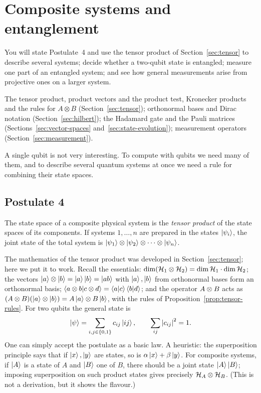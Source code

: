 \section{Composite systems and entanglement}\label{sec:composite}

\begin{objectives}
  You will state Postulate~4 and use the tensor product of Section~\ref{sec:tensor} to describe several systems; decide whether a two-qubit state is entangled; measure one part of an entangled system; and see how general measurements arise from projective ones on a larger system.
\end{objectives}

\begin{recall}
  The tensor product, product vectors and the product test, Kronecker products and the rules for $A\otimes B$ (Section~\ref{sec:tensor}); orthonormal bases and Dirac notation (Section~\ref{sec:hilbert}); the Hadamard gate and the Pauli matrices (Sections~\ref{sec:vector-spaces} and~\ref{sec:state-evolution}); measurement operators (Section~\ref{sec:measurement}).
\end{recall}

A single qubit is not very interesting. To compute with qubits we need many of them, and to describe several quantum systems at once we need a rule for combining their state spaces.

\subsection{Postulate 4}

\begin{postulate}\label{post:composite}
  The state space of a composite physical system is the \emph{tensor product} of the state spaces of its components. If systems $1,\dots,n$ are prepared in the states $\left|\psi_i\right\rangle$, the joint state of the total system is $\left|\psi_1\right\rangle\otimes\left|\psi_2\right\rangle\otimes\cdots\otimes\left|\psi_n\right\rangle$.
\end{postulate}

The mathematics of the tensor product was developed in Section~\ref{sec:tensor}; here we put it to work. Recall the essentials: $\dim(\mathcal{H}_1\otimes\mathcal{H}_2)=\dim\mathcal{H}_1\cdot\dim\mathcal{H}_2$; the vectors $\left|a\right\rangle\otimes\left|b\right\rangle=\left|a\right\rangle\left|b\right\rangle=\left|ab\right\rangle$ with $\left|a\right\rangle,\left|b\right\rangle$ from orthonormal bases form an orthonormal basis; $\left\langle a\otimes b\middle|c\otimes d\right\rangle=\left\langle a\middle|c\right\rangle\left\langle b\middle|d\right\rangle$; and the operator $A\otimes B$ acts as $(A\otimes B)(\left|a\right\rangle\otimes\left|b\right\rangle)=A\left|a\right\rangle\otimes B\left|b\right\rangle$, with the rules of Proposition~\ref{prop:tensor-rules}. For two qubits the general state is
\[
  \left|\psi\right\rangle=\sum_{i,j\in\{0,1\}}c_{ij}\left|ij\right\rangle,\qquad\sum_{ij}\left|c_{ij}\right|^2=1 .
\]
One can simply accept the postulate as a basic law. A heuristic: the superposition principle says that if $\left|x\right\rangle,\left|y\right\rangle$ are states, so is $\alpha\left|x\right\rangle+\beta\left|y\right\rangle$. For composite systems, if $\left|A\right\rangle$ is a state of $A$ and $\left|B\right\rangle$ one of $B$, there should be a joint state $\left|A\right\rangle\left|B\right\rangle$; imposing superposition on such product states gives precisely $\mathcal{H}_A\otimes\mathcal{H}_B$.
(This is not a derivation, but it shows the flavour.)


